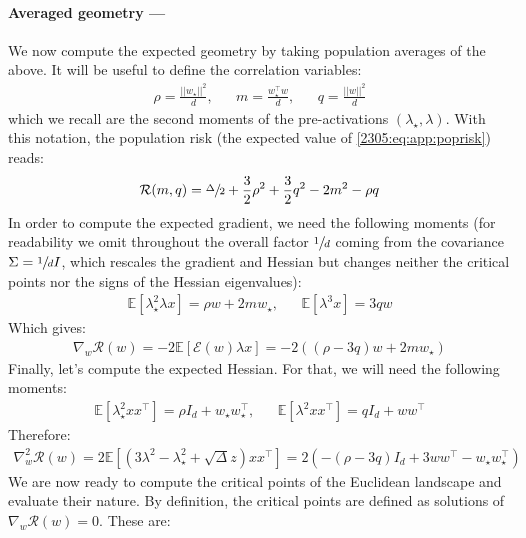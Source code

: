 \paragraph{Averaged geometry ---} We now compute the expected geometry by taking population averages of the above. It will be useful to define the correlation variables:
\begin{align}
   \rho = \frac{||w_{\star}||^2}{d}, && m = \frac{w_{\star}^{\top}w}{d}, && q = \frac{||w||^2}{d}
\end{align}
 which we recall are the second moments of the pre-activations $(\lambda_{\star},\lambda)$. With this notation, the population risk (the expected value of \eqref{2305:eq:app:poprisk}) reads:
\begin{align}
    \mathcal{R}(m,q) =\sfrac{\Delta}{2}+ \frac{3}{2}\rho^2+\frac{3}{2}q^2-2m^2-\rho q
\end{align}
In order to compute the expected gradient, we need the following moments (for readability we omit throughout the overall factor \(\sfrac1d\) coming from the covariance \(\Sigma=\sfrac1d I\), which rescales the gradient and Hessian but changes neither the critical points nor the signs of the Hessian eigenvalues):
\begin{align}
    \mathbb{E}[\lambda_{\star}^2\lambda x] = \rho w+2m w_{\star}, && \mathbb{E}[\lambda^3 x] = 3q w
\end{align}
Which gives:
\begin{align}
    \nabla_{w}\mathcal{R}(w) = -2\mathbb{E}\left[\mathcal{E}(w)\lambda x\right]= -2((\rho-3q) w+2m w_{\star})
\end{align}
Finally, let's compute the expected Hessian. For that, we will need the following moments:
    \begin{align}
        \mathbb{E}[\lambda^{2}_{\star}xx^{\top}] = \rho I_{d}+w_{\star}w_{\star}^{\top}, && \mathbb{E}[\lambda^{2}xx^{\top}] = q I_{d}+w w^{\top}
    \end{align}
    Therefore:
    \begin{align}
        \nabla_{w}^2\mathcal{R}(w) = 2\mathbb{E}\left[(3\lambda^2-\lambda_{\star}^2+\sqrt{\Delta}z)xx^{\top}\right]=2\left(-(\rho-3q)I_{d}+3w w^{\top}-w_{\star}w_{\star}^{\top}\right)
    \end{align}
    We are now ready to compute the critical points of the Euclidean landscape and evaluate their nature. By definition, the critical points are defined as solutions of $\nabla_{w}\mathcal{R}(w)=0$. These are:
